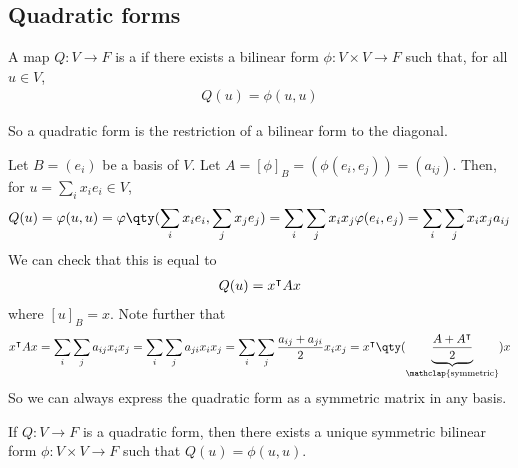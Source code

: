 \subsection{Quadratic forms}
\begin{definition}
	A map $Q \colon V \to F$ is a  if there exists a bilinear form $\phi \colon V \times V \to F$ such that, for all $u \in V$,
	\begin{align*}
		Q(u) = \phi(u,u)
	\end{align*}
\end{definition}
So a quadratic form is the restriction of a bilinear form to the diagonal.

\begin{remark}
	Let $B = (e_i)$ be a basis of $V$.
	Let $A = [\phi]_B = (\phi(e_i, e_j)) = (a_{ij})$.
	Then, for $u = \sum_i x_i e_i \in V$,
	\begin{align*}
		Q(u) = \phi(u,u) = \phi\qty(\sum_i x_i e_i, \sum_j x_j e_j) = \sum_i \sum_j x_i x_j \phi(e_i, e_j) = \sum_i \sum_j x_i x_j a_{ij}
	\end{align*}
	We can check that this is equal to
	\begin{align*}
		Q(u) = x^\intercal A x
	\end{align*}
	where $[u]_B = x$.
	Note further that
	\begin{align*}
		x^\transpose A x = \sum_i \sum_j a_{ij} x_i x_j = \sum_i \sum_j a_{ji} x_i x_j = \sum_i \sum_j \frac{a_{ij} + a_{ji}}{2} x_i x_j = x^\transpose \qty(\underbrace{\frac{A + A^\transpose}{2}}_{\mathclap{\text{symmetric}}}) x
	\end{align*}
	So we can always express the quadratic form as a symmetric matrix in any basis.
\end{remark}

\begin{proposition}
	If $Q \colon V \to F$ is a quadratic form, then there exists a unique symmetric bilinear form $\phi \colon V \times V \to F$ such that $Q(u) = \phi(u,u)$.
\end{proposition}

